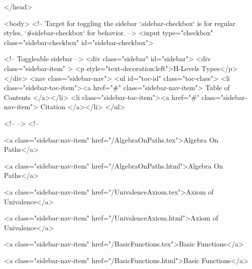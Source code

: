   
</head>




  <body>
    <!-- Target for toggling the sidebar `.sidebar-checkbox` is for regular
     styles, `#sidebar-checkbox` for behavior. -->
<input type="checkbox" class="sidebar-checkbox" id="sidebar-checkbox">

<!-- Toggleable sidebar -->
<div class="sidebar" id="sidebar">
  <div class="sidebar-item" >
    <p style="text-decoration:left">H-Levels Types</p>
  </div>
  <nav class="sidebar-nav">
    <ul id="toc-id" class="toc-class">
  <li class="sidebar-toc-item"><a href="#" class="sidebar-nav-item"> Table of Contents </a></li>
  <li class="sidebar-toc-item"><a href="#" class="sidebar-nav-item"> Citation </a></li>
</ul>


    <!--  -->
    <!-- 
      
    
      
    
      
    
      
        
      
    
      
        
          <a class="sidebar-nav-item" href="/AlgebraOnPaths.tex">Algebra On Paths</a>
        
      
    
      
        
          <a class="sidebar-nav-item" href="/AlgebraOnPaths.html">Algebra On Paths</a>
        
      
    
      
        
          <a class="sidebar-nav-item" href="/UnivalenceAxiom.tex">Axiom of Univalence</a>
        
      
    
      
        
          <a class="sidebar-nav-item" href="/UnivalenceAxiom.html">Axiom of Univalence</a>
        
      
    
      
        
          <a class="sidebar-nav-item" href="/BasicFunctions.tex">Basic Functions</a>
        
      
    
      
        
          <a class="sidebar-nav-item" href="/BasicFunctions.html">Basic Functions</a>
        
      
    
      
        
